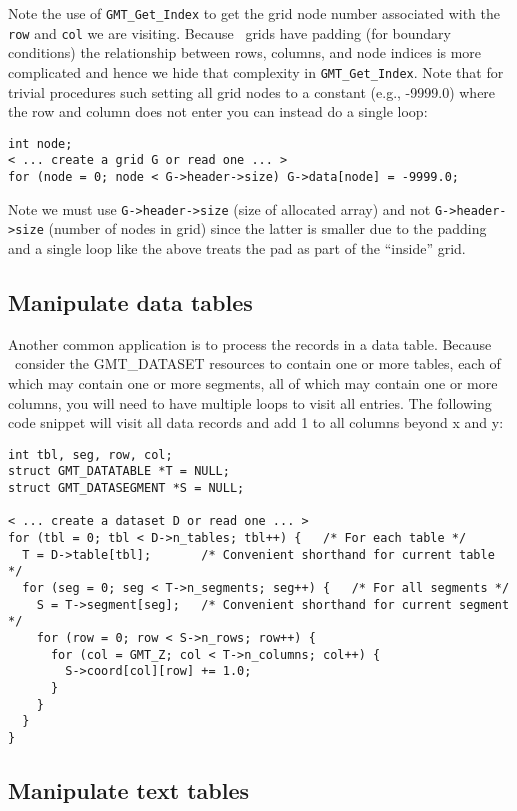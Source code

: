 \documentclass[11pt]{report}
\begin{document}
Note the use of \texttt{GMT\_Get\_Index} to get the grid node number associated
with the \texttt{row} and \texttt{col} we are visiting.  Because \GMT\ grids have
padding (for boundary conditions) the relationship between rows, columns, and
node indices is more complicated and hence we hide that complexity in \texttt{GMT\_Get\_Index}.
Note that for trivial procedures such setting all grid nodes to a constant (e.g., -9999.0)
where the row and column does not enter you can instead do a single loop:

\begin{verbatim}
int node;
< ... create a grid G or read one ... >
for (node = 0; node < G->header->size) G->data[node] = -9999.0;
\end{verbatim}

Note we must use \texttt{G->header->size} (size of allocated array) and not
\texttt{G->header->size} (number of nodes in grid) since the latter is smaller
due to the padding and a single loop like the above treats the pad as part of
the ``inside'' grid.

\subsection{Manipulate data tables}

Another common application is to process the records in a data table.
Because \GMT\ consider the GMT\_DATASET resources to contain one or
more tables, each of which may contain one or more segments, all of
which may contain one or more columns, you will need to have multiple
loops to visit all entries.  The following code snippet will visit
all data records and add 1 to all columns beyond x and y:

\begin{verbatim}
int tbl, seg, row, col;
struct GMT_DATATABLE *T = NULL;
struct GMT_DATASEGMENT *S = NULL;

< ... create a dataset D or read one ... >
for (tbl = 0; tbl < D->n_tables; tbl++) {	/* For each table */
  T = D->table[tbl];       /* Convenient shorthand for current table */
  for (seg = 0; seg < T->n_segments; seg++) {	/* For all segments */
    S = T->segment[seg];   /* Convenient shorthand for current segment */
    for (row = 0; row < S->n_rows; row++) {
      for (col = GMT_Z; col < T->n_columns; col++) {
        S->coord[col][row] += 1.0;
      }
    }
  }
}
\end{verbatim}

\subsection{Manipulate text tables}
\end{document}
